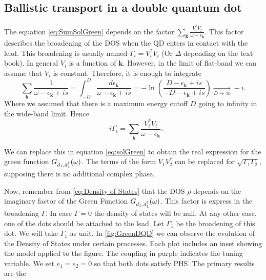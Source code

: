 \subsection{Ballistic transport in a  double quantum dot \label{sec:GreedDQD}}
The equation \eqref{eq:SumSolGreen} depends on the factor $\sum_{\boldsymbol{k}}\frac{V_{i}^{*}V_{j}}{\omega-\epsilon_{\boldsymbol{k}}}$. This factor describes the broadening of the DOS when the QD enters in contact with the lead. This broadening is usually named $\Gamma_i=V_{i}^{*}V_{i}$ (Or $\Delta$ depending on the text book). 
In general $V_i$  is a function of $\textbf{k}$. However, in the limit of flat-band we can assume that $V_i $ is constant. Therefore, it is enough to integrate
\begin{equation}
    \sum_{\boldsymbol{k}}\frac{1}{\omega-\epsilon_{\boldsymbol{k}}+is}=\int_{-D}^{D}\frac{d\epsilon_{\boldsymbol{k}}}{\omega-\epsilon_{\boldsymbol{k}}+is}=-\ln\left(\frac{D-\epsilon_{\boldsymbol{k}}+is}{-D-\epsilon_{\boldsymbol{k}}+is}\right)\xrightarrow[D\rightarrow\infty]{}-i.
\end{equation}
Where we assumed that there is a maximum  energy cutoff $D$ going to infinity in the wide-band limit. Hence 
\begin{equation}
   -i\Gamma_i = \sum_{\boldsymbol{k}}\frac{V_{i}^{*}V_{i}}{\omega-\epsilon_{\boldsymbol{k}}}.
\end{equation}



We can replace this in equation \eqref{eq:solGreen} to obtain the real expression for the green function $G_{d_1,d_1^\dagger}(\omega)$. The terms of the form $V_1V_2^*$ can be replaced for $\sqrt{\Gamma_1\Gamma_2}$, supposing there is no additional complex phase.

Now, remember from \eqref{eq:Density of States} that the DOS $\rho$ depends on the imaginary factor of the Green Function $G_{d_1,d_1^\dagger}(\omega)$. This factor is express in the broadening $\Gamma$. In case $\Gamma = 0$ the density of states will be null. At any other case, one of the dots should be attached to the lead. Let $\Gamma_1$ be the broadening of this dot. We will take $\Gamma_1$ as unit.  
In \ref{fig:GreenDQD} we can observe the evolution of the Density of States under certain processes. Each plot includes an inset showing the model applied to the figure. The coupling in purple indicates the tuning variable. We set $e_1 = e_2 = 0$ so that both dots satisfy PHS. The primary results are the 



